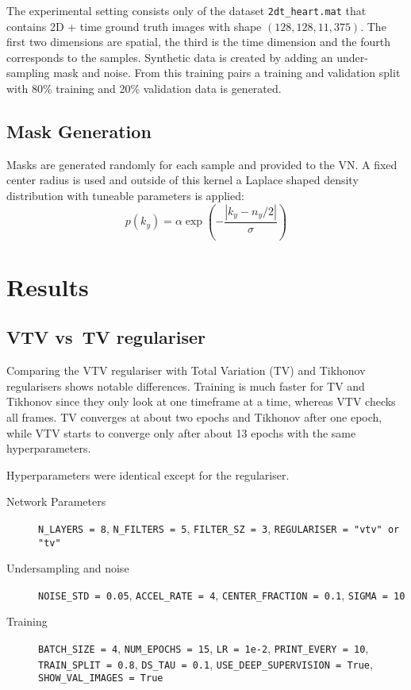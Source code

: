 The experimental setting consists only of the dataset \verb|2dt_heart.mat| that contains 2D + time ground truth images with shape $(128, 128, 11, 375)$. The first two dimensions are spatial, the third is the time dimension and the fourth corresponds to the samples. Synthetic data is created by adding an under-sampling mask and noise. From this training pairs a training and validation split with 80\% training and 20\% validation data is generated.

\section{Mask Generation}

Masks are generated randomly for each sample and provided to the VN. A fixed center radius is used and outside of this kernel a Laplace shaped density distribution with tuneable parameters is applied:
\[
  p(k_y) = \alpha \exp \left( -\frac{|k_y - n_y/2|}{\sigma} \right)
\]

\chapter{Results}

\section{VTV vs\ TV regulariser}

Comparing the VTV regulariser with Total Variation (TV) and Tikhonov regularisers shows notable differences. Training is much faster for TV and Tikhonov since they only look at one timeframe at a time, whereas VTV checks all frames. TV converges at about two epochs and Tikhonov after one epoch, while VTV starts to converge only after about 13 epochs with the same hyperparameters.

Hyperparameters were identical except for the regulariser.

\begin{description}
  \item[Network Parameters] \verb|N_LAYERS = 8|, \verb|N_FILTERS = 5|, \verb|FILTER_SZ = 3|, \verb|REGULARISER = "vtv" or "tv"|
  \item[Undersampling and noise] \verb|NOISE_STD = 0.05|, \verb|ACCEL_RATE = 4|, \verb|CENTER_FRACTION = 0.1|, \verb|SIGMA = 10|
  \item[Training] \verb|BATCH_SIZE = 4|, \verb|NUM_EPOCHS = 15|, \verb|LR = 1e-2|, \verb|PRINT_EVERY = 10|, \verb|TRAIN_SPLIT = 0.8|, \verb|DS_TAU = 0.1|, \verb|USE_DEEP_SUPERVISION = True|, \verb|SHOW_VAL_IMAGES = True|
\end{description}

